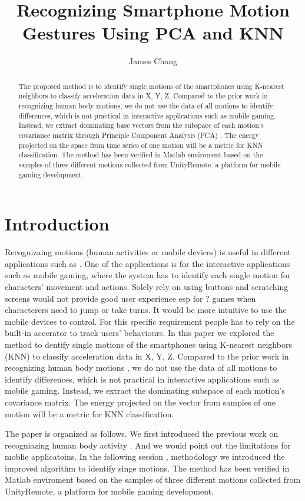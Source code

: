 \documentclass[acmtog]{acmart}
\title{Recognizing Smartphone Motion Gestures Using PCA and KNN}
\author{James Chang }
\affiliation{%
  \institution{University of Penn }
  \city{Phili}
  \country{USA}}
\begin{document}
\begin{abstract}
The proposed method is to identify  single motions of the smartphones using  K-nearest neighbors to  classify acceleration  data in X, Y, Z. Compared to the prior work in recognizing human body motions, we do not use the data of all motions to identify differences, which is not practical in interactive applications such as mobile gaming. Instead, we  extract dominating base vectors from the subspace of each motion's covariance matrix through Principle Component Analysis (PCA) . The energy projected on the space from time series of one motion will be a metric for KNN classification.   The method has been verified in Matlab enviroment based on the samples of three different motions collected from UnityRemote, a platform for mobile gaming development.
\end{abstract}

\maketitle

\section{Introduction}
Recognizaing motions (human activities or mobile devices) is useful in different applications such as \cite{human_activity_paper}. One of the applications is for the interactive applications such as mobile gaming, where the system has to identify each single motion for characters' movement and actions. Solely rely on using buttons and scratching screens would not provide good user experience esp for ? games when characterers need to jump or take turns. It would be more intuitive to use the mobile devices to control. For this specific requirement people has to rely on the built-in accerator to track users' behaviours.
In this paper we explored the method to dentify  single motions of the smartphones using  K-nearest neighbors (KNN) to  classify acceleration  data in X, Y, Z. Compared to the prior work in recognizing human body motions \cite{matlab1}, we do not use the data of all motions to identify differences, which is not practical in interactive applications such as mobile gaming. Instead, we  extract the dominating  subspace of each motion's covariance matrix. The energy projected on the vector from samples of one motion will be a metric for KNN classification. 

The paper is organized as follows. We first introduced the previous work on recogniazing human body activity . And we would point out the limitations for moblie applicatoins. In the following session , methodology we introduced the improved algorithm to identify singe motions. The method has been verified in Matlab enviroment based on the samples of three different motions collected from UnityRemote, a platform for mobile gaming development.
\end{document}
